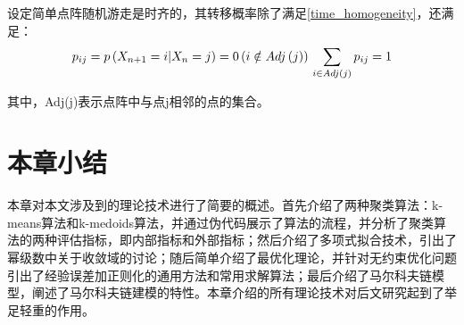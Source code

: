 设定简单点阵随机游走是时齐的，其转移概率除了满足\ref{time_homogeneity}，还满足：
\begin{equation}
\label{random_walk}
p_{ij}=p\left( X_{n+1}=i|X_n=j \right) =0 \left( i\notin Adj\left( j \right) \right) 
\\
\sum_{i\in Adj\left( j \right)}{p_{ij}=1}
\end{equation}

其中，Adj(j)表示点阵中与点j相邻的点的集合。

\section{本章小结}

本章对本文涉及到的理论技术进行了简要的概述。首先介绍了两种聚类算法：k-means算法和k-medoids算法，并通过伪代码展示了算法的流程，并分析了聚类算法的两种评估指标，即内部指标和外部指标；然后介绍了多项式拟合技术，引出了幂级数中关于收敛域的讨论；随后简单介绍了最优化理论，并针对无约束优化问题引出了经验误差加正则化的通用方法和常用求解算法；最后介绍了马尔科夫链模型，阐述了马尔科夫链建模的特性。本章介绍的所有理论技术对后文研究起到了举足轻重的作用。